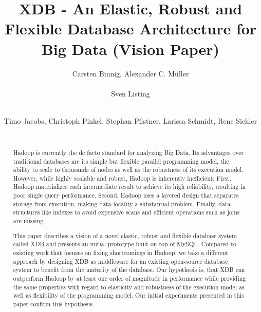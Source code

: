 \documentclass{sig-alternate}
\begin{document}
\title{XDB - An Elastic, Robust and Flexible Database Architecture for Big Data (Vision Paper)}


\author{
\alignauthor
Carsten Binnig, Alexander C. M\"uller\\
       \\
\alignauthor
Sven Listing\\
       \\
\and
\alignauthor
Timo Jacobs, Christoph Pinkel, Stephan Pfistner, Larissa Schmidt, Rene Sichler\\
      \\
\vspace{-2ex}
}

\maketitle
\begin{abstract}

Hadoop is currently the de facto standard for analyzing Big Data. Its advantages over traditional databases are its simple but flexible parallel programming model, the ability to scale to thousands of nodes as well as the robustness of its execution model. However, while highly scalable and robust, Hadoop is inherently inefficient: First, Hadoop materializes each intermediate result to achieve its high reliability, resulting in poor single query performance. Second, Hadoop uses a layered design that separates storage from execution, making data locality a substantial problem. Finally, data structures like indexes to avoid expensive scans and efficient operations such as joins are missing. 

This paper describes a vision of a novel elastic, robust and flexible database system called XDB and presents an initial prototype built on top of MySQL. Compared to existing work that focuses on fixing shortcomings in Hadoop, we take a different approach by designing XDB as middleware for an existing open-source database system to benefit from the maturity of the database.
Our hypothesis is, that XDB can outperform Hadoop by at least one order of magnitude in performance while providing the same properties with regard to elasticity and robustness of the execution model as well as flexibility of the programming model. Our initial experiments presented in this paper confirm this hypothesis.

\end{abstract}
\end{document}
